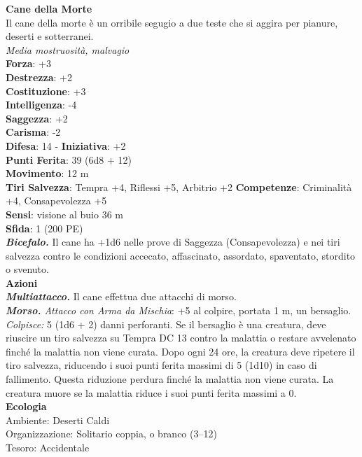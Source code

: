 \begin{multicols}{2}
\medskip\textbf{Cane della Morte}\\
Il cane della morte è un orribile segugio a due teste che si aggira per pianure, deserti e sotterranei.\\
\emph{Media mostruosità, malvagio}\\
\textbf{Forza}: +3\\
\textbf{Destrezza}: +2\\
\textbf{Costituzione}: +3\\
\textbf{Intelligenza}: -4\\
\textbf{Saggezza}: +2\\
\textbf{Carisma}: -2\\
\textbf{Difesa}: 14 - \textbf{Iniziativa}: +2\\
\textbf{Punti Ferita}: 39 (6d8 + 12)\\
\textbf{Movimento}: 12 m\\
\textbf{Tiri Salvezza}: Tempra +4, Riflessi +5, Arbitrio +2 
\textbf{Competenze}: Criminalità +4, Consapevolezza +5\\
\textbf{Sensi}: visione al buio 36 m\\
\textbf{Sfida}: 1 (200 PE)\smallskip\\
\emph{\textbf{Bicefalo.}} Il cane ha +1d6 nelle prove di Saggezza (Consapevolezza) e nei tiri salvezza contro le condizioni accecato, affascinato, assordato, spaventato, stordito o svenuto.\\
\smallskip\textbf{Azioni}\\
\emph{\textbf{Multiattacco.}} Il cane effettua due attacchi di morso.\\
\emph{\textbf{Morso.} Attacco con Arma da Mischia}: +5 al colpire, portata 1 m, un bersaglio.\\
\emph{Colpisce:} 5 (1d6 + 2) danni perforanti. Se il bersaglio è una creatura, deve riuscire un tiro salvezza su Tempra DC  13 contro la malattia o restare avvelenato finché la malattia non viene curata. Dopo ogni 24 ore, la creatura deve ripetere il tiro salvezza, riducendo i suoi punti ferita massimi di 5 (1d10) in caso di fallimento. Questa riduzione perdura finché la malattia non viene curata. La creatura muore se la malattia riduce i suoi punti ferita massimi a 0. \\
\textbf{Ecologia}\\
Ambiente: Deserti Caldi\\
Organizzazione: Solitario coppia, o branco (3–12)\\
Tesoro: Accidentale\\

\end{multicols}
